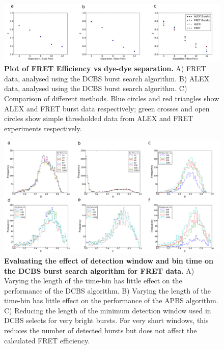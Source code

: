 \documentclass[10pt]{article}
\begin{document}
\begin{figure}[!ht]
   \begin{center}
      \includegraphics*[clip=true, width=6in]{Bp_vs_E.pdf}
      \caption{{\bf Plot of FRET Efficiency vs dye-dye separation.} A) FRET data, analysed using the DCBS burst search algorithm. B) ALEX data, analysed using the DCBS burst search algorithm. C) Comparison of different methods. Blue circles and red triangles show ALEX and FRET burst data respectively; green crosses and open circles show simple thresholded data from ALEX and FRET experiments respectively.}
      \label{fig:fig6_Eplots}
   \end{center}
\end{figure}

\begin{figure}[!ht]
   \begin{center}
      \includegraphics*[clip=true, width=6in]{window_effect.pdf}
      \caption{{\bf Evaluating the effect of detection window and bin time on the DCBS burst search algorithm for FRET data.} A) Varying the length of the time-bin has little effect on the performance of the DCBS algorithm. B) Varying the length of the time-bin has little effect on the performance of the APBS algorithm. C) Reducing the length of the minimum detection window used in DCBS selects for very bright bursts. For very short windows, this reduces the number of detected bursts but does not affect the calculated FRET efficiency.}
      \label{fig:fig7_binning}
   \end{center}
\end{figure}
\end{document}
